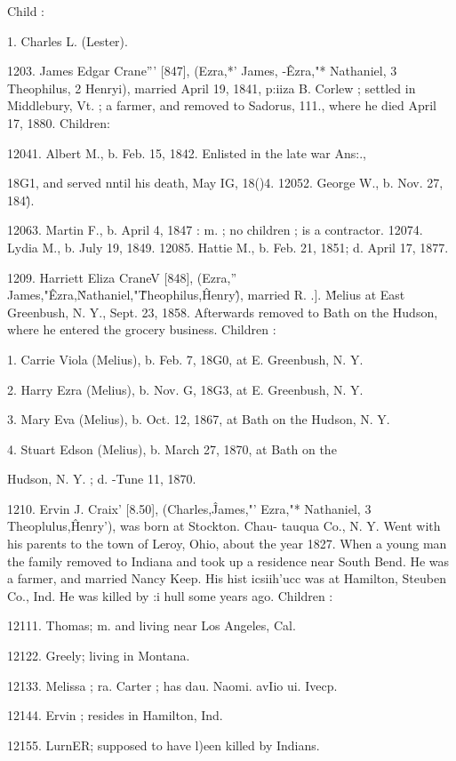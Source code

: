 \documentclass{book}
\begin{document}
Child : 

1. Charles L. (Lester). 

1203. James Edgar Crane''' [847], (Ezra,*' James, -\^ Ezra,"* 
Nathaniel, 3 Theophilus, 2 Henryi), married April 19, 1841, p:iiza 
B. Corlew ; settled in Middlebury, Vt. ; a farmer, and removed 
to Sadorus, 111., where he died April 17, 1880. Children: 

12041. Albert M., b. Feb. 15, 1842. Enlisted in the late war Ans:., 

18G1, and served nntil his death, May IG, 18()4. 
12052. George W., b. Nov. 27, 184\^). 

12063. Martin F., b. April 4, 1847 : m. ; no children ; is a contractor. 
12074. Lydia M., b. July 19, 1849. 
12085. Hattie M., b. Feb. 21, 1851; d. April 17, 1877. 

1209. Harriett Eliza CraneV [848], (Ezra,'' James,"\^ Ezra,\^ 
Nathaniel,"\^ Theophilus,\^ Henry\^), married R. .]. \^Melius at East 
Greenbush, N. Y., Sept. 23, 1858. Afterwards removed to Bath 
on the Hudson, where he entered the grocery business. Children : 

1. Carrie Viola (Melius), b. Feb. 7, 18G0, at E. Greenbush, N. Y. 

2. Harry Ezra (Melius), b. Nov. G, 18G3, at E. Greenbush, N. Y. 

3. Mary Eva (Melius), b. Oct. 12, 1867, at Bath on the Hudson, N. Y. 

4. Stuart Edson (Melius), b. March 27, 1870, at Bath on the 

Hudson, N. Y. ; d. -Tune 11, 1870. 

1210. Ervin J. Craix' [8.50], (Charles,\^ James,"' Ezra,"* 
Nathaniel, 3 Theoplulus,\^ Henry'), was born at Stockton. Chau- 
tauqua Co., N. Y. Went with his parents to the town of Leroy, 
Ohio, about the year 1827. When a young man the family 
removed to Indiana and took up a residence near South Bend. 
He was a farmer, and married Nancy Keep. His hist icsiih'ucc 
was at Hamilton, Steuben Co., Ind. He was killed by :i hull 
some years ago. Children : 

12111. Thomas; m. and living near Los Angeles, Cal. 

12122. Greely; living in Montana. 

12133. Melissa ; ra. Carter ; has dau. Naomi. avIio ui. Ivecp. 

12144. Ervin ; resides in Hamilton, Ind. 

12155. LurnER; supposed to have l)een killed by Indians. 
\end{document}
